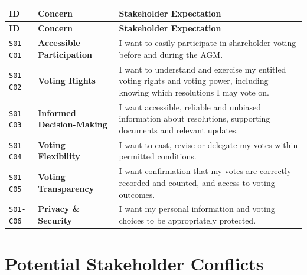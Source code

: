 \documentclass[11pt,a4paper]{article}
\begin{document}
\begingroup\small
\begin{longtable}{@{}>{\raggedright\arraybackslash}p{}>{\raggedright\arraybackslash}p{}>{\raggedright\arraybackslash}p{}@{}}
\toprule
\textbf{ID} & \textbf{Concern} & \textbf{Stakeholder Expectation} \\
\midrule
\endfirsthead
\toprule
\textbf{ID} & \textbf{Concern} & \textbf{Stakeholder Expectation} \\
\midrule
\endhead
\bottomrule
\endfoot
\texttt{S01-C01} & \textbf{Accessible Participation} & I want to easily participate in shareholder voting before and during the AGM. \\
\addlinespace
\texttt{S01-C02} & \textbf{Voting Rights} & I want to understand and exercise my entitled voting rights and voting power, including knowing which resolutions I may vote on. \\
\addlinespace
\texttt{S01-C03} & \textbf{Informed Decision-Making} & I want accessible, reliable and unbiased information about resolutions, supporting documents and relevant updates. \\
\addlinespace
\texttt{S01-C04} & \textbf{Voting Flexibility} & I want to cast, revise or delegate my votes within permitted conditions. \\
\addlinespace
\texttt{S01-C05} & \textbf{Voting Transparency} & I want confirmation that my votes are correctly recorded and counted, and access to voting outcomes. \\
\addlinespace
\texttt{S01-C06} & \textbf{Privacy \& Security} & I want my personal information and voting choices to be appropriately protected. \\
\end{longtable}
\endgroup


\section*{Potential Stakeholder Conflicts}
\end{document}
